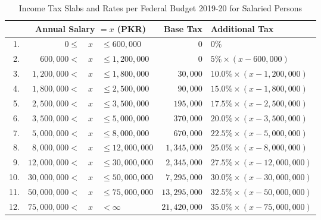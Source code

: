\documentclass[a4paper,11pt]{article}
\begin{document}


\begin{table}[h]\centering
\begin{tabular}{rrclrl}\toprule
	& \multicolumn{3}{c}{\textbf{Annual Salary $=x$ (PKR)}} & \textbf{Base Tax} & \textbf{Additional Tax} \\ \midrule
	1. & $0 \leq$ & $x$ & $\leq 600{,}000$ & 0 & $0\%$ \\ \midrule
	2. & $600{,}000<$ & $x$ & $\leq 1{,}200{,}000$ & 0 & $5\% \times (x - 600{,}000)$ \\ \midrule
	3. & $1{,}200{,}000<$ & $x$ & $\leq 1{,}800{,}000$ & $30{,}000$ &  $10.0\% \times (x - 1{,}200{,}000)$ \\ \midrule
	4. & $1{,}800{,}000<$ & $x$ & $\leq 2{,}500{,}000$ & $90{,}000$& $15.0\% \times (x - 1{,}800{,}000)$ \\ \midrule
	5. & $2{,}500{,}000<$ & $x$ & $\leq 3{,}500{,}000$ & $195{,}000$& $17.5\% \times (x - 2{,}500{,}000)$ \\ \midrule
	6. & $3{,}500{,}000<$ & $x$ & $\leq 5{,}000{,}000$ & $370{,}000$& $20.0\% \times (x - 3{,}500{,}000)$ \\ \midrule
	7. & $5{,}000{,}000<$ & $x$ & $\leq 8{,}000{,}000$ & $670{,}000$& $22.5\% \times (x - 5{,}000{,}000)$ \\ \midrule
	8. & $8{,}000{,}000<$ & $x$ & $\leq 12{,}000{,}000$ & $1{,}345{,}000$ & $25.0\% \times (x - 8{,}000{,}000)$ \\ \midrule
	9. & $12{,}000{,}000<$ & $x$ & $\leq 30{,}000{,}000$ & $2{,}345{,}000$ & $27.5\% \times (x - 12{,}000{,}000)$ \\ \midrule
	10. & $30{,}000{,}000<$ & $x$ & $\leq 50{,}000{,}000$ & $7{,}295{,}000$ &  $30.0\% \times (x - 30{,}000{,}000)$ \\ \midrule
	11. & $50{,}000{,}000<$ & $x$ & $\leq 75{,}000{,}000$ & $13{,}295{,}000$ &  $32.5\% \times (x - 50{,}000{,}000)$ \\ \midrule
	12. & $75{,}000{,}000<$ & $x$ & $< \infty$ & $21{,}420{,}000$ & $35.0\% \times (x - 75{,}000{,}000)$ \\ \bottomrule
\end{tabular}
\caption{Income Tax Slabs and Rates per Federal Budget 2019-20 for Salaried Persons}
\label{tab:tax-19-20}
\end{table}
\end{document}
